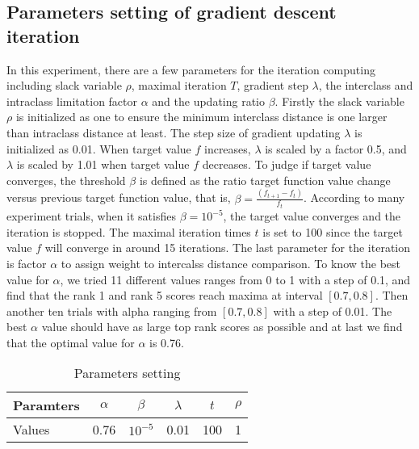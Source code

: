 \documentclass[conference,compsoc]{IEEEtran}
\begin{document}
\subsection{Parameters setting of gradient descent iteration}
In this experiment, there are a few parameters for the iteration computing including slack variable $\rho$, maximal iteration $T$, gradient step $\lambda$, the interclass and intraclass limitation factor $\alpha$ and the updating ratio $\beta$. Firstly the slack variable $\rho$ is initialized as one to ensure the minimum interclass distance is one larger than intraclass distance at least. The step size of gradient updating $\lambda$ is initialized as 0.01. When target value $f$ increases,  $\lambda$ is scaled by a factor 0.5, and  $\lambda$ is scaled by 1.01 when target value $f$ decreases. To judge if target value converges, the threshold $\beta$ is defined as the ratio target function value change versus previous target function value, that is, $\beta = \frac{(f_{t+1}-f_t)}{f_t}$. According to many experiment trials, when it satisfies $\beta = 10^{-5}$, the target value converges and the iteration is stopped. The maximal iteration times $t$ is set to 100 since the target value $f$ will converge in around 15 iterations.  The last parameter for the iteration is factor $\alpha$ to assign weight to intercalss distance comparison. To know the best value for $\alpha$, we tried 11 different values ranges from 0 to 1 with a step of 0.1, and find that the rank 1 and rank 5 scores reach maxima at interval $[0.7,0.8]$. Then another ten trials with alpha ranging from $[0.7,0.8]$ with a step of 0.01. The best $\alpha$ value should have as large top rank scores as possible and at last we find that the optimal value for $\alpha$ is 0.76.
\begin{table}[H]
\centering
\caption{Parameters setting}
\begin{tabular}{|l|c|c|c|c|c|}
\hline
Paramters &$\alpha$& $\beta$& $\lambda$&$t$& $\rho$\\
\hline
Values &0.76&$10^{-5}$&0.01&100&1\\
\hline
\end{tabular}
\end{table}

\end{document}
